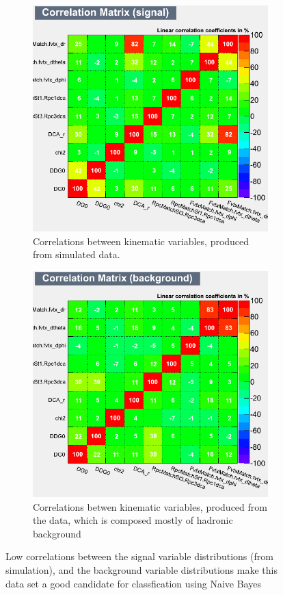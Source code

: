 \begin{figure}[H]
	\centering
	\begin{subfigure}[t]{0.5\textwidth}
		\centering
		\includegraphics[width=0.95\linewidth]{./figures/CorrelationMatrix_Signal.png}
		\caption{Correlations between kinematic variables, produced from simulated
			data.}
		\label{fig:corr_mat_sig}
	\end{subfigure}%
  \begin{subfigure}[t]{0.5\textwidth}
		\centering
		\includegraphics[width=0.95\linewidth]{./figures/CorrelationMatrix_Background.png}
		\caption{Correlations betwen kinematic variables, produced from the data,
			which is composed mostly of hadronic background}
		\label{fig:corr_mat_bkg}
	\end{subfigure}
	\caption{ Low correlations between the signal variable distributions (from
		simulation), and the background variable distributions make this data set a
		good candidate for classfication using Naive Bayes}
	\label{fig:kinematic_var_correlations}
\end{figure}

